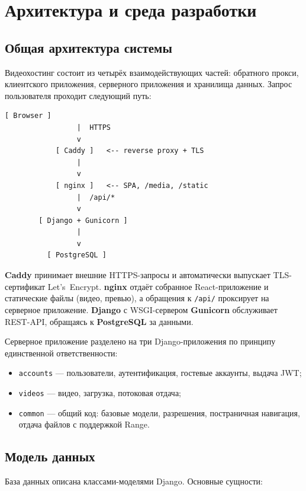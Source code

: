 \chapter{Архитектура и среда разработки}
\label{ch:architecture}

\section{Общая архитектура системы}

Видеохостинг состоит из четырёх взаимодействующих частей: обратного
прокси, клиентского приложения, серверного приложения и хранилища
данных. Запрос пользователя проходит следующий путь:

\begin{lstlisting}[breaklines=false]
            [ Browser ]
                 |  HTTPS
                 v
            [ Caddy ]   <-- reverse proxy + TLS
                 |
                 v
            [ nginx ]   <-- SPA, /media, /static
                 |  /api/*
                 v
        [ Django + Gunicorn ]
                 |
                 v
          [ PostgreSQL ]
\end{lstlisting}

\textbf{Caddy} принимает внешние HTTPS-запросы и автоматически выпускает
TLS-сертификат Let's~Encrypt. \textbf{nginx} отдаёт собранное
React-приложение и статические файлы (видео, превью), а обращения к
\texttt{/api/} проксирует на серверное приложение. \textbf{Django} с
WSGI-сервером \textbf{Gunicorn} обслуживает REST-API, обращаясь к
\textbf{PostgreSQL} за данными.

Серверное приложение разделено на три Django-приложения по принципу
единственной ответственности:
\begin{itemize}
  \item \texttt{accounts} — пользователи, аутентификация, гостевые
        аккаунты, выдача JWT;
  \item \texttt{videos} — видео, загрузка, потоковая отдача;
  \item \texttt{common} — общий код: базовые модели, разрешения,
        постраничная навигация, отдача файлов с поддержкой Range.
\end{itemize}

\section{Модель данных}

База данных описана классами-моделями Django. Основные сущности:

